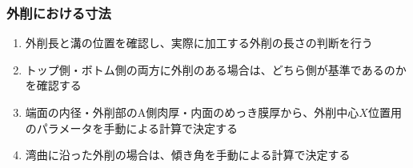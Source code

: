 
\subsubsection{外削における寸法}
\begin{enumerate}
\item {}外削長と溝の位置を確認し、実際に加工する外削の長さの判断を行う
\item トップ側・ボトム側の両方に外削のある場合は、どちら側が基準であるのかを確認する
\item {}端面の内径・外削部のA側肉厚・内面のめっき膜厚から、外削中心$X$位置用のパラメータを手動による計算で決定する
\item {}湾曲に沿った外削の場合は、傾き角を手動による計算で決定する
\end{enumerate}
